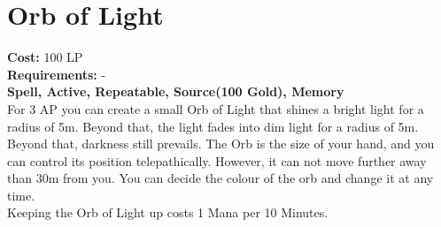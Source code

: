 \section{Orb of Light}\label{spell:orbOfLight}
\textbf{Cost:} 100 LP\\
\textbf{Requirements:} -\\
\textbf{Spell, Active, Repeatable, Source(100 Gold), Memory}\\
For 3 AP you can create a small Orb of Light that shines a bright light for a radius of 5m.
Beyond that, the light fades into dim light for a radius of 5m.
Beyond that, darkness still prevails.
The Orb is the size of your hand, and you can control its position telepathically.
However, it can not move further away than 30m from you.
You can decide the colour of the orb and change it at any time. \\
Keeping the Orb of Light up costs 1 Mana per 10 Minutes.